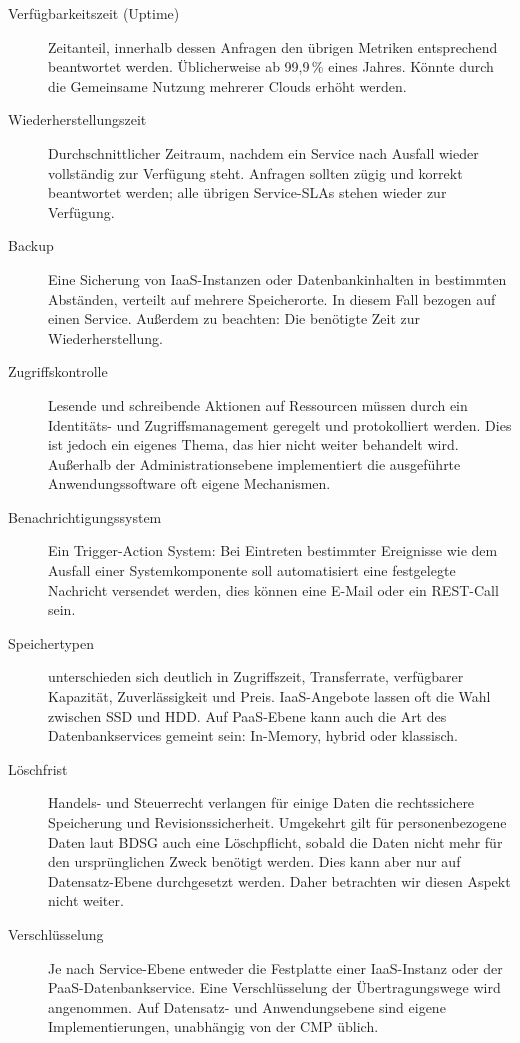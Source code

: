 \begin{description}
	\item[Verfügbarkeitszeit (Uptime)] Zeitanteil, innerhalb dessen Anfragen den übrigen Metriken entsprechend beantwortet werden. Üblicherweise ab 99,9\,\% eines Jahres. Könnte durch die Gemeinsame Nutzung mehrerer Clouds erhöht werden.	
	
	\item[Wiederherstellungszeit] Durchschnittlicher Zeitraum, nachdem ein Service nach Ausfall wieder vollständig zur Verfügung steht. Anfragen sollten zügig und korrekt beantwortet werden; alle übrigen Service-SLAs stehen wieder zur Verfügung.
	
	\item[Backup] Eine Sicherung von IaaS-Instanzen oder Datenbankinhalten in bestimmten Abständen, verteilt auf mehrere Speicherorte. In diesem Fall bezogen auf einen Service. Außerdem zu beachten: Die benötigte Zeit zur Wiederherstellung.
	
	\item[Zugriffskontrolle] Lesende und schreibende Aktionen auf Ressourcen müssen durch ein Identitäts- und Zugriffsmanagement geregelt und protokolliert werden. Dies ist jedoch ein eigenes Thema, das hier nicht weiter behandelt wird. Außerhalb der Administrationsebene implementiert die ausgeführte Anwendungssoftware oft eigene Mechanismen.
		
	\item[Benachrichtigungssystem] Ein Trigger-Action System: Bei Eintreten bestimmter Ereignisse wie dem Ausfall einer Systemkomponente soll automatisiert eine festgelegte Nachricht versendet werden, dies können eine E-Mail oder ein REST-Call sein.
	
	\item[Speichertypen] unterschieden sich deutlich in Zugriffszeit, Transferrate, verfügbarer Kapazität, Zuverlässigkeit und Preis. IaaS-Angebote lassen oft die Wahl zwischen SSD und HDD. Auf PaaS-Ebene kann auch die Art des Datenbankservices gemeint sein: In-Memory, hybrid oder klassisch.
	
	\item[Löschfrist] Handels- und Steuerrecht verlangen für einige Daten die rechtssichere Speicherung und Revisionssicherheit. Umgekehrt gilt für personenbezogene Daten laut BDSG auch eine Löschpflicht, sobald die Daten nicht mehr für den ursprünglichen Zweck benötigt werden. Dies kann aber nur auf Datensatz-Ebene durchgesetzt werden. Daher betrachten wir diesen Aspekt nicht weiter.
	
	\item[Verschlüsselung] Je nach Service-Ebene entweder die Festplatte einer IaaS-Instanz oder der PaaS-Datenbankservice. Eine Verschlüsselung der Übertragungswege wird angenommen. Auf Datensatz- und Anwendungsebene sind eigene Implementierungen, unabhängig von der CMP üblich.
	

\end{description}
